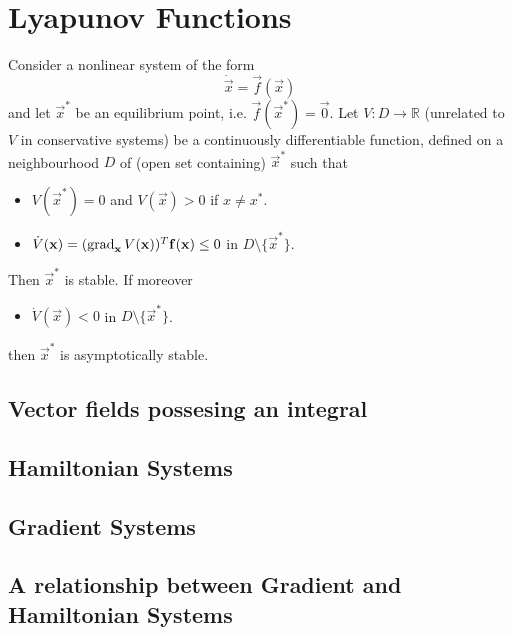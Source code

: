 \section{Lyapunov Functions}
\begin{theorem}
	Consider a nonlinear system of the form
	\begin{equation*}
		\dot{\vec x} = \vec f(\vec x)
	\end{equation*}
	and let $\vec x^\ast$ be an equilibrium point, i.e. $\vec f(\vec x^\ast) = \vec 0$.
	Let $V: D \to \mathbb R$ (unrelated to $V$ in conservative systems) be a continuously differentiable function, defined on a neighbourhood $D$ of (open set containing) $\vec x^\ast$ such that
	\begin{itemize}
		\item $V(\vec x^\ast) = 0$ and $V(\vec x) > 0$ if $x \neq x^\ast$.
		\item $\dot V(\boldsymbol{\mathbf{x}}) = (\operatorname{grad}_{\boldsymbol{\mathbf{x}}} V(\boldsymbol{\mathbf{x}}))^T \boldsymbol{\mathbf{f}}(\boldsymbol{\mathbf{x}}) \leq 0$ in $D \setminus \{\vec x^\ast\}$.
	\end{itemize}
	Then $\vec x^\ast$ is stable. If moreover
	\begin{itemize}
		\item $\dot V(\vec x) < 0$ in $D \setminus \{\vec x^\ast\}$.
	\end{itemize}
	then $\vec x^\ast$ is asymptotically stable.
\end{theorem}

\subsection{Vector fields possesing an integral}
\subsection{Hamiltonian Systems}
\subsection{Gradient Systems}
\subsection{A relationship between Gradient and Hamiltonian Systems}
